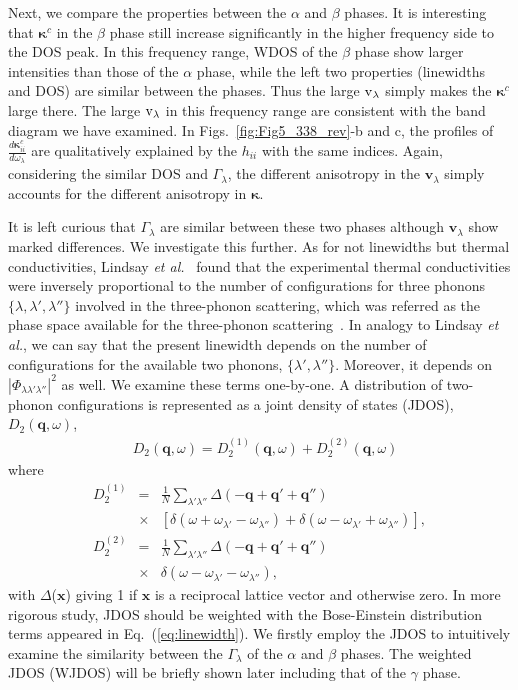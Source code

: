 \documentclass[twocolumn,amsmath,amssymb,a4paper,prb,superscriptaddress,floatfix]{revtex4-1}
\begin{document}
Next, we compare the properties between the $\alpha$ and $\beta$ phases.  It is
interesting that $\boldsymbol{\kappa}^c$ in the $\beta$ phase still increase
significantly in the higher frequency side to the DOS peak. In this frequency
range, WDOS of the $\beta$ phase show larger intensities than those of the
$\alpha$ phase, while the left two properties (linewidths and DOS) are similar
between the phases. Thus the large $\rm{v}_\lambda$ simply makes the
$\boldsymbol{\kappa}^c$ large there. The large $\rm{v}_\lambda$ in this
frequency range are consistent with the band diagram we have examined. In
Figs.~\ref{fig:Fig5_338_rev}-b and c, the profiles of
$\frac{d\boldsymbol{\kappa}^c_{ii}}{d\omega_\lambda}$ are qualitatively
explained by the $h_{ii}$ with the same indices.  Again, considering the similar
DOS and $\Gamma_{\lambda}$, the different anisotropy in the $\mathbf{v}_\lambda$
simply accounts for the different anisotropy in $\boldsymbol{\kappa}$. 

It is left curious that $\Gamma_\lambda$ are similar between these two phases
although $\mathbf{v}_\lambda$ show marked differences.  We investigate this
further. As for not linewidths but thermal conductivities, Lindsay {\it et
al.}~\cite{Lindsay} found that the experimental thermal conductivities were
inversely proportional to the number of configurations for three phonons
$\{\lambda, \lambda', \lambda''\}$ involved in the three-phonon scattering,
which was referred as the phase space available for the three-phonon
scattering~\cite{Lindsay}.  In analogy to Lindsay {\it et al.}, we can say that
the present linewidth depends on the number of configurations for the available
two phonons, $\{\lambda', \lambda''\}$.  Moreover, it depends on
$|\Phi_{\lambda\lambda'\lambda''}|^2$ as well. We examine these terms
one-by-one. A distribution of two-phonon configurations is represented as a
joint density of states (JDOS),
${D_2(\mathbf{q},\omega)}$,  
\begin{align}
 \label{eq:jdos}
 &D_2(\mathbf{q},\omega) = D_2^{(1)}(\mathbf{q},\omega) +  D_2^{(2)}(\mathbf{q},\omega)
\end{align}
where 
\begin{eqnarray*}
	D_2^{(1)} & = & \frac{1}{N} \sum_{\lambda'\lambda''}\Delta(-\mathbf{q} + \mathbf{q'} + \mathbf{q''}) \nonumber \\
								   & \times & [\delta(\omega + \omega_{\lambda'} - \omega_{\lambda''}) + \delta(\omega - \omega_{\lambda'} + \omega_{\lambda''})],\\
	D_2^{(2)} & = & \frac{1}{N} \sum_{\lambda'\lambda''}\Delta(-\mathbf{q} + \mathbf{q'} + \mathbf{q''}) \nonumber \\
								   & \times & \delta(\omega - \omega_{\lambda'} - \omega_{\lambda''}),
\end{eqnarray*}
with $\Delta$($\mathbf{x}$) giving 1 if $\mathbf{x}$ is a reciprocal lattice
vector and otherwise zero.  In more rigorous study, JDOS should be weighted with
the Bose-Einstein distribution terms appeared in Eq.~(\ref{eq:linewidth}).  We
firstly employ the JDOS to intuitively examine the similarity between the
$\Gamma_{\lambda}$ of the $\alpha$ and $\beta$ phases. The weighted JDOS (WJDOS)
will be briefly shown later including that of the $\gamma$ phase. 
\end{document}
